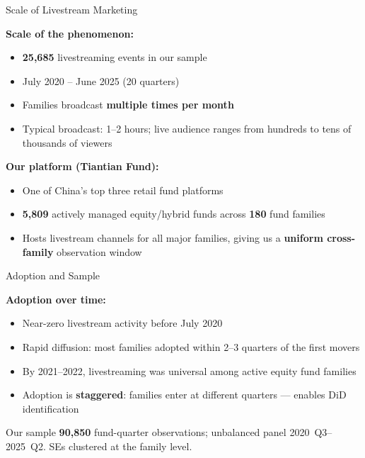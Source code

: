\documentclass[11pt, aspectratio=169]{beamer}
\newcommand{\hl}[1]{\textcolor{myblue}{\textbf{#1}}}
\begin{document}

\begin{frame}{Scale of Livestream Marketing}

\textbf{Scale of the phenomenon:}
\begin{itemize}
  \item \hl{25,685} livestreaming events in our sample
  \item July 2020 -- June 2025 (20 quarters)
  \item Families broadcast \hl{multiple times per month}
  \item Typical broadcast: 1--2 hours; live audience ranges
  from hundreds to tens of thousands of viewers
\end{itemize}

\vspace{0.35cm}
\textbf{Our platform (Tiantian Fund):}
\begin{itemize}
  \item One of China's top three retail fund platforms
  \item \hl{5,809} actively managed equity/hybrid funds
  across \hl{180} fund families
  \item Hosts livestream channels for all major families,
  giving us a \hl{uniform cross-family} observation window
\end{itemize}

\end{frame}


\begin{frame}{Adoption and Sample}

\textbf{Adoption over time:}
\begin{itemize}
  \item Near-zero livestream activity before July 2020
  \item Rapid diffusion: most families adopted within
  2--3 quarters of the first movers
  \item By 2021--2022, livestreaming was universal among
  active equity fund families
  \item Adoption is \hl{staggered}: families enter at
  different quarters --- enables DiD identification
\end{itemize}

\vspace{0.4cm}
\begin{block}{Our sample}
  \hl{90,850} fund-quarter observations; unbalanced panel
  2020~Q3--2025~Q2. SEs clustered at the family level.
\end{block}

\end{frame}
\end{document}

